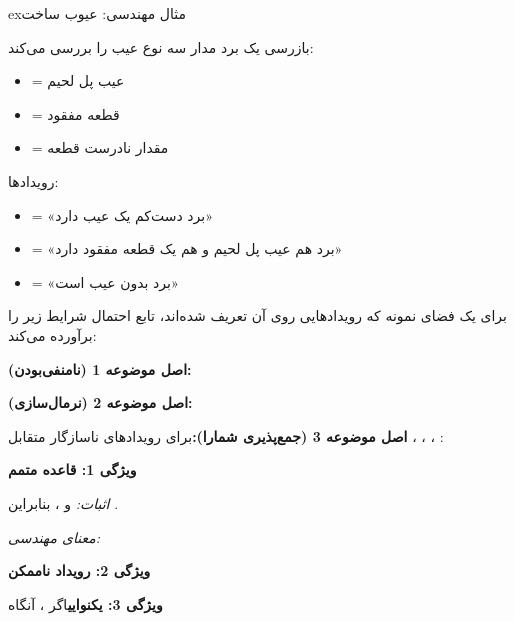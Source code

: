 \begin{PSbox}[unbreakable]{ex}{مثال مهندسی: عیوب ساخت}

بازرسی یک برد مدار سه نوع عیب را بررسی می‌کند:

\begin{itemize}
\tightlist
\item
   = عیب پل لحیم
\item
   = قطعه مفقود
\item
   = مقدار نادرست قطعه
\end{itemize}

رویدادها:

\begin{itemize}
\tightlist
\item
   = «برد دست‌کم یک عیب دارد»
\item
   = «برد هم عیب پل لحیم و هم یک قطعه مفقود دارد»
\item
   = «برد بدون عیب است»
\end{itemize}

\end{PSbox}



برای یک فضای نمونه  که رویدادهایی روی آن تعریف شده‌اند، تابع احتمال  شرایط زیر را برآورده می‌کند:

\textbf{اصل موضوعه 1 (نامنفی‌بودن):}

\textbf{اصل موضوعه 2 (نرمال‌سازی):}

\textbf{اصل موضوعه 3 (جمع‌پذیری شمارا):}\PSbr{}برای رویدادهای ناسازگار متقابل ، ، ، :


\textbf{ویژگی 1: قاعده متمم}

\emph{اثبات:}  و ، بنابراین .

\emph{معنای مهندسی:} 

\textbf{ویژگی 2: رویداد ناممکن}

\textbf{ویژگی 3: یکنوایی}\PSbr{}اگر ، آنگاه 

